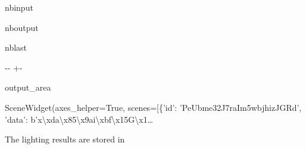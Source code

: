 \documentclass[letterpaper,10pt,english]{sphinxmanual}
\begin{document}
\begin{sphinxuseclass}{nbinput}
{
\begin{sphinxVerbatim}[commandchars=\\\{\}]
\llap{\color{nbsphinxin}[8]:\,\hspace{\fboxrule}\hspace{\fboxsep}}
              
             
              
\end{sphinxVerbatim}
}

\end{sphinxuseclass}
\begin{sphinxuseclass}{nboutput}
\begin{sphinxuseclass}{nblast}
{

\kern-\sphinxverbatimsmallskipamount\kern-\baselineskip
\kern+\FrameHeightAdjust\kern-\fboxrule
\vspace{\nbsphinxcodecellspacing}

\begin{sphinxuseclass}{output_area}
\begin{sphinxuseclass}{}


\begin{sphinxVerbatim}[commandchars=\\\{\}]
\llap{\color{nbsphinxout}[8]:\,\hspace{\fboxrule}\hspace{\fboxsep}}SceneWidget(axes\_helper=True, scenes=[\{'id': 'PeUbme32J7raIm5wbjhizJGRd', 'data': b'x\textbackslash{}xda\textbackslash{}x85\textbackslash{}x9ai\textbackslash{}xbf\textbackslash{}x15G\textbackslash{}x1…
\end{sphinxVerbatim}



\end{sphinxuseclass}
\end{sphinxuseclass}
}

\end{sphinxuseclass}
\end{sphinxuseclass}
\sphinxAtStartPar
The lighting results are stored in 
\end{document}
